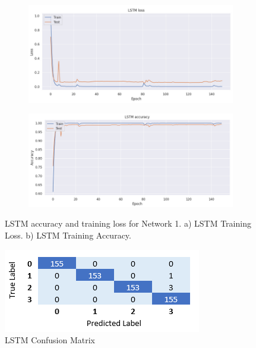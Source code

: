 \documentclass[journal]{IEEEtran}
\begin{document}
\begin{figure}[t]
	\centering
	\begin{subfigure}[b]{0.92\linewidth}
		\centering
		\includegraphics[width=0.92\linewidth]{LSTM_train_loss}
		\caption{}
		\label{fig:lstm_loss}
	\end{subfigure}
	\begin{subfigure}[b]{0.92\linewidth}
		\centering
		\includegraphics[width=0.92\linewidth]{LSTM_train_accuracy}
		\caption{}
		\label{fig:lstm_acc}
	\end{subfigure}
	\caption{LSTM accuracy and training loss for Network 1. a) LSTM Training Loss. b) LSTM Training Accuracy.}
	\label{fig:lstm_a_l}
\end{figure}



\begin{figure}[t]
	\centering
	\includegraphics[width=0.88\linewidth]{LSTM_confusion_matrix}
	\caption{LSTM Confusion Matrix}
	\label{fig:lstm_cm}
\end{figure}
\end{document}
